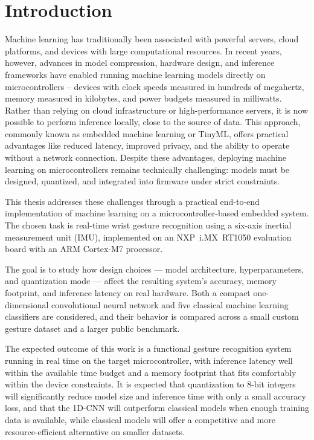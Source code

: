 
\chapter{Introduction}

Machine learning has traditionally been associated with powerful servers, cloud platforms, and devices with large computational resources. In recent years, however, advances in model compression, hardware design, and inference frameworks have enabled running machine learning models directly on microcontrollers -- devices with clock speeds measured in hundreds of megahertz, memory measured in kilobytes, and power budgets measured in milliwatts. Rather than relying on cloud infrastructure or high-performance servers, it is now possible to perform inference locally, close to the source of data. This approach, commonly known as embedded machine learning or TinyML, offers practical advantages like reduced latency, improved privacy, and the ability to operate without a network connection. Despite these advantages, deploying machine learning on microcontrollers remains technically challenging: models must be designed, quantized, and integrated into firmware under strict constraints.

This thesis addresses these challenges through a practical end-to-end implementation of machine learning on a microcontroller-based embedded system. The chosen task is real-time wrist gesture recognition using a six-axis inertial measurement unit (IMU), implemented on an NXP~i.MX~RT1050 evaluation board with an ARM Cortex-M7 processor. 

The goal is to study how design choices — model architecture, hyperparameters, and quantization mode — affect the resulting system's accuracy, memory footprint, and inference latency on real hardware. Both a compact one-dimensional convolutional neural network and five classical machine learning classifiers are considered, and their behavior is compared across a small custom gesture dataset and a larger public benchmark.
 
The expected outcome of this work is a functional gesture recognition system running in real time on the target microcontroller, with inference latency well within the available time budget and a memory footprint that fits comfortably within the device constraints. It is expected that quantization to 8-bit integers will significantly reduce model size and inference time with only a small accuracy loss, and that the 1D-CNN will outperform classical models when enough training data is available, while classical models will offer a competitive and more resource-efficient alternative on smaller datasets.

